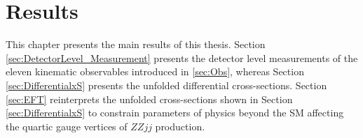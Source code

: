 \part {\LARGE{Results}}
\label{sec:Results}

This chapter presents the main results of this thesis. Section \ref{sec:DetectorLevel_Measurement} presents the detector level measurements of the eleven kinematic observables introduced in \ref{sec:Obs}, whereas Section \ref{sec:DifferentialxS} presents the unfolded differential cross-sections. Section \ref{sec:EFT} reinterprets the unfolded cross-sections shown in Section \ref{sec:DifferentialxS} to constrain parameters of physics beyond the SM affecting the quartic gauge vertices of $ZZjj$ production. 




